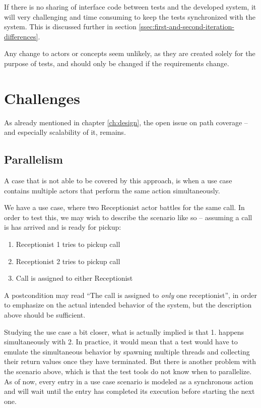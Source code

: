 \noindent If there is no sharing of interface code between tests and the developed system, it will very challenging and time consuming to keep the tests synchronized with the system. This is discussed further in section \ref{ssec:first-and-second-iteration-differences}.\medskip

\noindent Any change to actors or concepts seem unlikely, as they are created solely for the purpose of tests, and should only be changed if the requirements change.

\section{Challenges}
As already mentioned in chapter \ref{ch:design}, the open issue on path coverage -- and especially scalability of it, remains.

\subsection{Parallelism}
\label{sec:parallelism}
A case that is not able to be covered by this approach, is when a use case contains multiple actors that perform the same action simultaneously.\medskip

\noindent We have a use case, where two Receptionist actor battles for the same call. In order to test this, we may wish to describe the scenario like so -- assuming a call is has arrived and is ready for pickup:
\begin{enumerate}
 \item Receptionist 1 tries to pickup call
 \item Receptionist 2 tries to pickup call
 \item Call is assigned to either Receptionist
\end{enumerate}
A postcondition may read ``The call is assigned to \emph{only} one receptionist'', in order to emphasize on the actual intended behavior of the system, but the description above should be sufficient.\medskip

\noindent Studying the use case a bit closer, what is actually implied is that 1. happens simultaneously with 2. In practice, it would mean that a test would have to emulate the simultaneous behavior by spawning multiple threads and collecting their return values once they have terminated. But there is another problem with the scenario above, which is that the test tools do not know when to parallelize. As of now, every entry in a use case scenario is modeled as a synchronous action and will wait until the entry has completed its execution before starting the next one.\medskip

